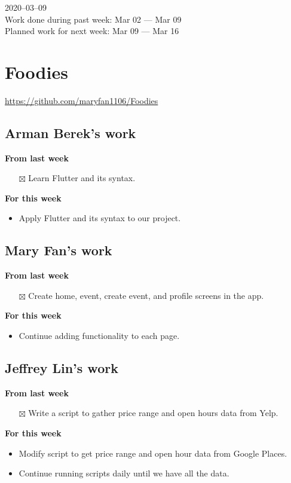 \documentclass[12pt,letterpaper]{article}
\newcommand{\done}{$\boxtimes$}
\begin{document}
2020--03--09 \\
Work done during past week: Mar 02 --- Mar 09 \\
Planned work for next week: Mar 09 --- Mar 16

\section*{Foodies}
\url{https://github.com/maryfan1106/Foodies}

\subsection*{Arman Berek's work}

\textbf{From last week}
\begin{itemize}
  \item[\done] Learn Flutter and its syntax.
\end{itemize}


\textbf{For this week}
\begin{itemize}
  \item Apply Flutter and its syntax to our project.
\end{itemize}


\subsection*{Mary Fan's work}

\textbf{From last week}
\begin{itemize}
  \item[\done] Create home, event, create event, and profile screens in the app.
\end{itemize}


\textbf{For this week}
\begin{itemize}
  \item Continue adding functionality to each page.
\end{itemize}


\subsection*{Jeffrey Lin's work}

\textbf{From last week}
\begin{itemize}
  \item[\done] Write a script to gather price range and open hours data from Yelp.
\end{itemize}


\textbf{For this week}
\begin{itemize}
  \item Modify script to get price range and open hour data from Google Places.
  \item Continue running scripts daily until we have all the data.
\end{itemize}
\end{document}
